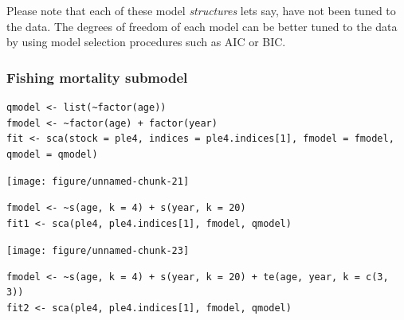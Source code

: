 \documentclass[a4paper,english,10pt]{article}\usepackage[]{graphicx}\usepackage[]{color}
\makeatletter
\newenvironment{kframe}{%
 \def\at@end@of@kframe{}%
 \ifinner\ifhmode%
  \def\at@end@of@kframe{\end{minipage}}%
  \begin{minipage}{\columnwidth}%
 \fi\fi%
 \def\FrameCommand##1{\hskip\@totalleftmargin \hskip-\fboxsep
 \colorbox{shadecolor}{##1}\hskip-\fboxsep
     \hskip-\linewidth \hskip-\@totalleftmargin \hskip\columnwidth}%
 \MakeFramed {\advance\hsize-\width
   \@totalleftmargin\z@ \linewidth\hsize
   \@setminipage}}%
 {\par\unskip\endMakeFramed%
 \at@end@of@kframe}
\newenvironment{knitrout}{}{} %
\makeatother
\begin{document}
Please note that each of these model \emph{structures} lets say, have not been tuned to the data.  The degrees of freedom of each model can be better tuned to the data by using model selection procedures such as AIC or BIC.

\subsubsection{Fishing mortality submodel}

\begin{knitrout}
\color{fgcolor}\begin{kframe}
\begin{verbatim}
qmodel <- list(~factor(age))
fmodel <- ~factor(age) + factor(year)
fit <- sca(stock = ple4, indices = ple4.indices[1], fmodel = fmodel, qmodel = qmodel)
\end{verbatim}
\end{kframe}
\end{knitrout}


\begin{knitrout}
\color{fgcolor}

{\centering \texttt{[image: figure/unnamed-chunk-21]} 

}



\end{knitrout}


\begin{knitrout}
\color{fgcolor}\begin{kframe}
\begin{verbatim}
fmodel <- ~s(age, k = 4) + s(year, k = 20)
fit1 <- sca(ple4, ple4.indices[1], fmodel, qmodel)
\end{verbatim}
\end{kframe}
\end{knitrout}


\begin{knitrout}
\color{fgcolor}

{\centering \texttt{[image: figure/unnamed-chunk-23]} 

}



\end{knitrout}


\begin{knitrout}
\color{fgcolor}\begin{kframe}
\begin{verbatim}
fmodel <- ~s(age, k = 4) + s(year, k = 20) + te(age, year, k = c(3, 3))
fit2 <- sca(ple4, ple4.indices[1], fmodel, qmodel)
\end{verbatim}
\end{kframe}
\end{knitrout}
\end{document}
